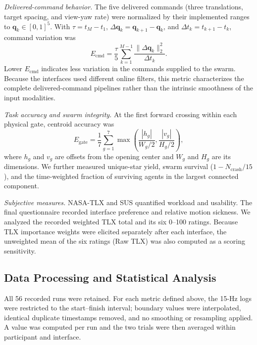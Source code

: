 \documentclass[conference, a4paper]{IEEEtran}
\begin{document}
\emph{Delivered-command behavior.}
The five delivered commands (three translations, target spacing, and view-yaw
rate) were normalized by their implemented ranges to
$\mathbf{q}_k\in[0,1]^5$. With $\tau=t_M-t_1$,
$\Delta\mathbf{q}_k=\mathbf{q}_{k+1}-\mathbf{q}_k$, and
$\Delta t_k=t_{k+1}-t_k$, command variation was
\begin{equation}
E_{\mathrm{cmd}}=\frac{\tau}{5}\sum_{k=1}^{M-1}
\frac{\lVert\Delta\mathbf{q}_k\rVert_2^2}{\Delta t_k}.
\label{eq:command_metrics}
\end{equation}
Lower $E_{\mathrm{cmd}}$ indicates less variation in the commands supplied to
the swarm. Because the interfaces used different online filters, this metric
characterizes the complete delivered-command pipelines rather than the
intrinsic smoothness of the input modalities.

\emph{Task accuracy and swarm integrity.}
At the first forward crossing within each physical gate, centroid accuracy was
\begin{equation}
E_{\mathrm{gate}}=\frac{1}{7}\sum_{g=1}^{7}
\max\left(\frac{|h_g|}{W_g/2},\frac{|v_g|}{H_g/2}\right),
\label{eq:gate_error}
\end{equation}
where $h_g$ and $v_g$ are offsets from the opening center and $W_g$ and $H_g$
are its dimensions. We further measured unique-star yield, swarm survival
($1-N_{\mathrm{crash}}/15$), and the time-weighted fraction of surviving
agents in the largest connected component.

\emph{Subjective measures.}
NASA-TLX and SUS quantified workload and usability. The final questionnaire
recorded interface preference and relative motion sickness. We analyzed the
recorded weighted TLX total and its six 0--100 ratings. Because TLX importance
weights were elicited separately after each interface, the unweighted mean of
the six ratings (Raw TLX) was also computed as a scoring sensitivity.

\subsection{Data Processing and Statistical Analysis}
\label{sec:statistical_analysis}

All 56 recorded runs were retained. For each metric defined above, the 15-Hz
logs were restricted to the start--finish interval; boundary values were
interpolated, identical duplicate timestamps removed, and no smoothing or
resampling applied. A value was computed per run and the two trials were then
averaged within participant and interface.
\end{document}
